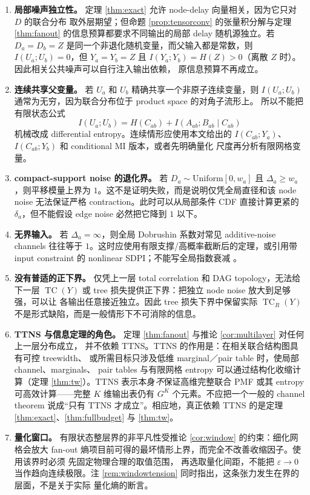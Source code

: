 \documentclass[a4paper,11pt]{article}
\theoremstyle{definition}
\newcommand{\1}{\mathbf 1}
\newcommand{\TC}{\operatorname{TC}}
\begin{document}
\begin{enumerate}
\item \textbf{局部噪声独立性。}
定理 \ref{thm:exact} 允许 node-delay 向量相关，因为它只对 $D$ 的联合分布
取外层期望；但命题 \ref{prop:tensorconv} 的张量积分解与定理
\ref{thm:fanout} 的信息预算都要求不同输出的局部 delay 随机源独立。若
$D_a=D_b=Z$ 是同一个非退化随机变量，而父输入都是常数，则
$I(U_a;U_b)=0$，但 $Y_a=Y_b=Z$ 且
$I(Y_a;Y_b)=H(Z)>0$（离散 $Z$ 时）。因此相关公共噪声可以自行注入输出依赖，
原信息预算不再成立。

\item \textbf{连续共享父变量。}
若 $U_a$ 和 $U_b$ 精确共享一个非原子连续变量，则
$I(U_a;U_b)$ 通常为无穷，因为联合分布位于 product space 的对角子流形上。
所以不能把有限状态公式
\[
I(U_a;U_b)=H(C_{ab})+I(A_{ab};B_{ab}\mid C_{ab})
\]
机械改成 differential entropy。连续情形应使用本文给出的
$I(C_{ab};Y_a)$、$I(C_{ab};Y_b)$ 和 conditional MI 版本，或者先明确量化
尺度再分析有限网格变量。

\item \textbf{compact-support noise 的退化界。}
若 $D_a\sim\mathrm{Uniform}[0,w_a]$ 且 $\Delta_a\ge w_a$，则平移模量上界为
$1$。这不是证明失败，而是说明仅凭全局直径和该 node noise 无法保证严格
contraction。此时可以从局部条件 CDF 直接计算更紧的 $\delta_a$，但不能假设
edge noise 必然把它降到 $1$ 以下。

\item \textbf{无界输入。}
若 $\Delta_a=\infty$，则全局 Dobrushin 系数对常见 additive-noise channels
往往等于 $1$。这时应使用有限支撑/高概率截断后的定理，或引用带 input
constraint 的 nonlinear SDPI；不能写全局指数衰减
\cite{PolyanskiyWu2016,Calmon2018}。

\item \textbf{没有普适的正下界。}
仅凭上一层 total correlation 和 DAG topology，无法给下一层
$\TC(Y)$ 或 tree 损失提供正下界：把独立 node noise 放大到足够强，可以让
各输出任意接近独立。因此 tree 损失下界中保留实际
$\TC_R(Y)$ 不是形式缺陷，而是一般情形下不可消除的信息。

\item \textbf{TTNS 与信息定理的角色。}
定理 \ref{thm:fanout} 与推论 \ref{cor:multilayer} 对任何上一层分布成立，
并不依赖 TTNS。TTNS 的作用是：在相关联合结构图具有可控 treewidth、
或所需目标只涉及低维 marginal／pair table 时，使局部 channel、marginals、
pair tables 与有限网格 entropy 可以通过结构化收缩计算（定理
\ref{thm:tw}）。TTNS 表示本身\emph{不}保证高维完整联合 PMF 或其 entropy
可高效计算——完整 $K$ 维输出表仍有 $G^K$ 个元素。不应把一个一般的
channel theorem 说成“只有 TTNS 才成立”。相应地，真正依赖 TTNS 的是定理
\ref{thm:exact}、\ref{thm:fullbudget} 与 \ref{thm:tw}。

\item \textbf{量化窗口。}
有限状态整层界的非平凡性受推论 \ref{cor:window} 的约束：细化网格会放大
fan-out 熵项目前可得的最坏情形上界，而完全不改善收缩因子。使用该界时必须
先固定物理合理的取值范围，
再选取量化间距，不能把 $\varepsilon\to0$ 当作趋向连续极限。注
\ref{rem:windowtension} 同时指出，这条张力发生在界的层面，不是关于实际
量化熵的断言。
\end{enumerate}
\end{document}
